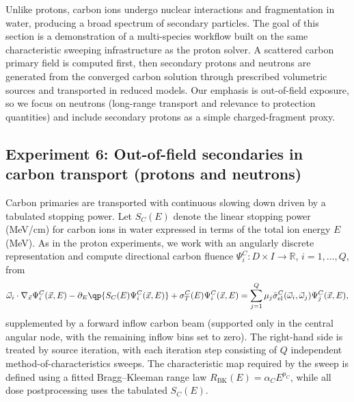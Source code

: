 \documentclass[final]{amsart}
\begin{document}
Unlike protons, carbon ions undergo nuclear interactions and
fragmentation in water, producing a broad spectrum of secondary
particles. The goal of this section is a demonstration of a
multi-species workflow built on the same characteristic sweeping
infrastructure as the proton solver. A scattered carbon primary field
is computed first, then secondary protons and neutrons are generated
from the converged carbon solution through prescribed volumetric
sources and transported in reduced models. Our emphasis is
out-of-field exposure, so we focus on neutrons (long-range transport
and relevance to protection quantities) and include secondary protons
as a simple charged-fragment proxy.

\subsection{Experiment 6: Out-of-field secondaries in carbon transport (protons and neutrons)}
\label{expC:multispecies}

Carbon primaries are transported with continuous slowing down driven by
a tabulated stopping power. Let $S_C(E)$ denote the linear stopping
power (MeV/cm) for carbon ions in water expressed in terms of the total
ion energy $E$ (MeV). As in the proton experiments, we work with an
angularly discrete representation and compute directional carbon fluence
$\Psi_i^C:D\times I\to\mathbb{R}$, $i=1,\dots,Q$, from
\begin{equation}
  \label{eq:carbon_DOM}
  \vec{\omega}_i \cdot \nabla_{\vec{x}} \Psi^C_i(\vec{x},E)
  -
  \partial_E\qp{S_C(E) \Psi^C_i(\vec{x},E)}
  +
  \sigma_T^C(E) \Psi^C_i(\vec{x},E)
  =
  \sum_{j=1}^Q \mu_j \bar\sigma_{\mathrm{el}}^C(\vec{\omega}_i,\vec{\omega}_j) \Psi^C_j(\vec{x},E),
\end{equation}
supplemented by a forward inflow carbon beam (supported only in the
central angular node, with the remaining inflow bins set to zero). The
right-hand side is treated by source iteration, with each iteration step
consisting of $Q$ independent method-of-characteristics sweeps. The
characteristic map required by the sweep is defined using a fitted
Bragg--Kleeman range law $R_{\mathrm{BK}}(E)=\alpha_C E^{p_C}$, while all
dose postprocessing uses the tabulated $S_C(E)$.
\end{document}

